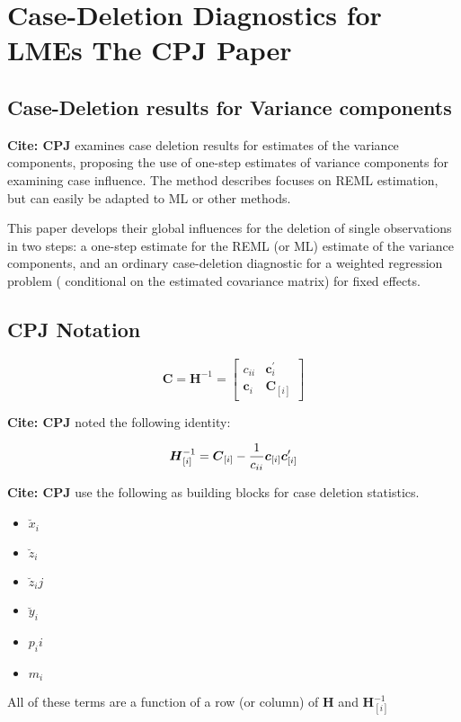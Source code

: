 \section{Case-Deletion Diagnostics for LMEs The CPJ Paper}%

\subsection{Case-Deletion results for Variance components}
\textbf{Cite: CPJ}  examines case deletion results for estimates of the variance components, proposing the use of one-step estimates of variance components for examining case influence. The method describes focuses on REML estimation, but can easily be adapted to ML or other methods.

This paper develops their global influences for the deletion of single observations in two steps: a one-step estimate for the REML (or ML) estimate of the variance components, and an ordinary case-deletion diagnostic for a weighted regression problem ( conditional on the estimated covariance matrix) for fixed effects.


\subsection{CPJ Notation} %

\[ \boldsymbol{C} = \boldsymbol{H}^{-1} = \left[
\begin{array}{cc}
c_{ii} & \boldsymbol{c}_{i}^{\prime}\\
\boldsymbol{c}_{i} &  \boldsymbol{C}_{[i]}
\end{array} \right]
\]

\textbf{Cite: CPJ}  noted the following identity:

\[ \boldsymbol{H}_{[i]}^{-1}  = \boldsymbol{C}_{[i]} - {1 \over c_{ii}}\boldsymbol{c}_{[i]}\boldsymbol{c}_{[i]}^{\prime} \]


\textbf{Cite: CPJ} use the following as building blocks for case deletion statistics.
\begin{itemize}
\item $\breve{x}_i$
\item $\breve{z}_i$
\item $\breve{z}_ij$
\item $\breve{y}_i$
\item $p_ii$
\item $m_i$
\end{itemize}
All of these terms are a function of a row (or column) of $\boldsymbol{H}$ and $\boldsymbol{H}_{[i]}^{-1}$







 
